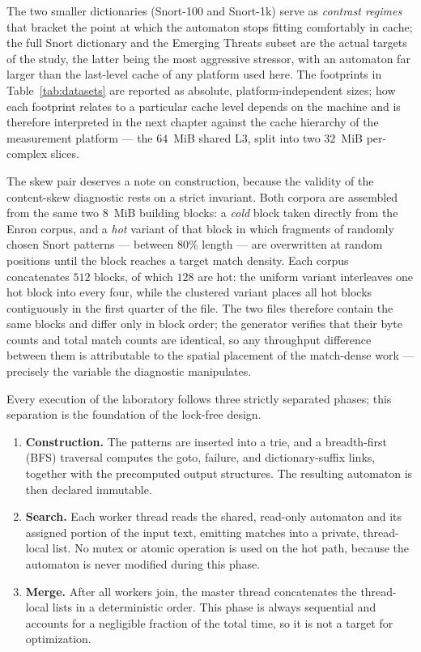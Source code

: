 The two smaller dictionaries (Snort-100 and Snort-1k) serve as
\textit{contrast regimes} that bracket the point at which the automaton stops
fitting comfortably in cache; the full Snort dictionary and the Emerging Threats
subset are the actual targets of the study, the latter being the most aggressive
stressor, with an automaton far larger than the last-level cache of any platform
used here. The footprints in Table~\ref{tab:datasets} are reported as absolute,
platform-independent sizes; how each footprint relates to a particular cache
level depends on the machine and is therefore interpreted in the next chapter
against the cache hierarchy of the measurement platform --- the $64$~MiB shared
L3, split into two $32$~MiB per-complex slices.

The skew pair deserves a note on construction, because the validity of the
content-skew diagnostic rests on a strict invariant. Both corpora are assembled
from the same two $8$~MiB building blocks: a \emph{cold} block taken directly
from the Enron corpus, and a \emph{hot} variant of that block in which fragments
of randomly chosen Snort patterns --- between $80\%$
length --- are overwritten at random positions until the block reaches a target
match density. Each corpus concatenates $512$ blocks, of which $128$ are hot:
the uniform variant interleaves one hot block into every four, while the
clustered variant places all hot blocks contiguously in the first quarter of the
file. The two files therefore contain the same blocks and differ only in block
order; the generator verifies that their byte counts and total match counts are
identical, so any throughput difference between them is attributable to the
spatial placement of the match-dense work --- precisely the variable the
diagnostic manipulates.


Every execution of the laboratory follows three strictly separated phases; this
separation is the foundation of the lock-free design.

\begin{enumerate}
    \item \textbf{Construction.} The patterns are inserted into a trie, and a
    breadth-first (BFS) traversal computes the goto, failure, and
    dictionary-suffix links, together with the precomputed output structures.
    The resulting automaton is then declared immutable.
    \item \textbf{Search.} Each worker thread reads the shared, read-only
    automaton and its assigned portion of the input text, emitting matches into
    a private, thread-local list. No mutex or atomic operation is used on the
    hot path, because the automaton is never modified during this phase.
    \item \textbf{Merge.} After all workers join, the master thread concatenates
    the thread-local lists in a deterministic order. This phase is always
    sequential and accounts for a negligible fraction of the total time, so it is
    not a target for optimization.
\end{enumerate}

